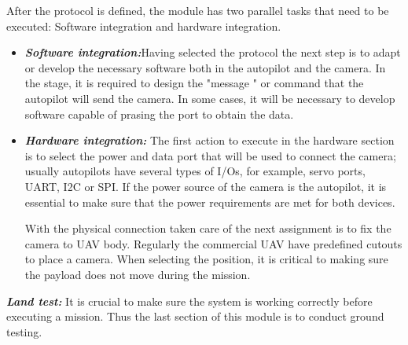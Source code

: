 After the protocol is defined, the module has two parallel tasks that need to be executed: Software integration and hardware integration.
\begin{itemize}
    \item \textbf{\textit{Software integration:}}Having selected the protocol the next step is to adapt or develop the necessary software both in the autopilot and the camera. In the stage, it is required to design the "message " or command that the autopilot will send the camera. In some cases, it will be necessary to develop software capable of prasing the port to obtain the data.
     \item \textbf{\textit{Hardware integration:}} The first action to execute in the hardware section is to select the power and data port that will be used to connect the camera; usually autopilots have several types of I/Os, for example, servo ports, UART, I2C or SPI. If the power source of the camera is the autopilot, it is essential to make sure that the power requirements are met for both devices.
     
With the physical connection taken care of the next assignment is to fix the camera to UAV body. Regularly the commercial UAV have predefined cutouts to place a camera. When selecting the position, it is critical to making sure the payload does not move during the mission.
     
\end{itemize}
\textit{\textbf{Land test:}} It is crucial to make sure the system is working correctly before executing a mission. Thus the last section of this module is to conduct ground testing.

